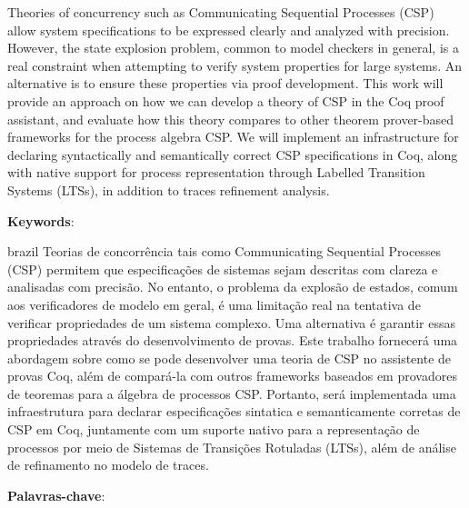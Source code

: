 \documentclass[
	12pt,				%
	a4paper,			%
	english,			%
	brazil				%
	]{abntex2}
\begin{document}

\frenchspacing 


\imprimircapa

\imprimirfolhaderosto

\begin{agradecimentos}

\end{agradecimentos}


\setlength{\absparsep}{18pt} %
\begin{resumo}
 Theories of concurrency such as Communicating Sequential Processes (CSP) allow system specifications to be expressed clearly and analyzed with precision. However, the state explosion problem, common to model checkers in general, is a real constraint when attempting to verify system properties for large systems. An alternative is to ensure these properties via proof development. This work will provide an approach on how we can develop a theory of CSP in the Coq proof assistant, and evaluate how this theory compares to other theorem prover-based frameworks for the process algebra CSP. We will implement an infrastructure for declaring syntactically and semantically correct CSP specifications in Coq, along with native support for process representation through Labelled Transition Systems (LTSs), in addition to traces refinement analysis.

 \textbf{Keywords}:
\end{resumo}

\begin{resumo}[Resumo]
 \begin{otherlanguage*}{brazil}
   Teorias de concorrência tais como Communicating Sequential Processes (CSP) permitem que especificações de sistemas sejam descritas com clareza e analisadas com precisão. No entanto, o problema da explosão de estados, comum aos verificadores de modelo em geral, é uma limitação real na tentativa de verificar propriedades de um sistema complexo. Uma alternativa é garantir essas propriedades através do desenvolvimento de provas. Este trabalho fornecerá uma abordagem sobre como se pode desenvolver uma teoria de CSP no assistente de provas Coq, além de compará-la com outros frameworks baseados em provadores de teoremas para  a álgebra de processos CSP. Portanto, será implementada uma infraestrutura para declarar especificações sintatica e semanticamente corretas de CSP em Coq, juntamente com um suporte nativo para a representação de processos por meio de Sistemas de Transições Rotuladas (LTSs), além de análise de refinamento no modelo de traces.
    
   \textbf{Palavras-chave}:
 \end{otherlanguage*}
\end{resumo}
\end{document}
